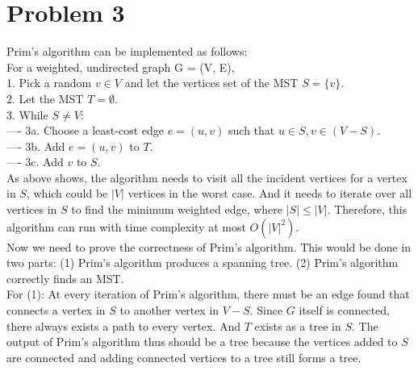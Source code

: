 \documentclass[titlepage, paper=a4, fontsize=11pt]{scrartcl} %
\numberwithin{equation}{section} %
\numberwithin{figure}{section} %
\numberwithin{table}{section} %
\begin{document}
\section*{Problem 3}
Prim's algorithm can be implemented as follows: \\
For a weighted, undirected graph G = (V, E), \\
1. Pick a random $v \in V$ and let the vertices set of the MST $S=\{v\}$. \\
2. Let the MST $T=\emptyset$. \\
3. While $S \neq V$: \\
---- 3a. Choose a least-cost edge $e=(u,v)$ such that $u \in S, v \in (V-S)$. \\
---- 3b. Add $e=(u,v)$ to $T$. \\
---- 3c. Add $v$ to $S$. \\

As above shows, the algorithm needs to visit all the incident vertices for a vertex in $S$, which could be $|V|$ vertices in the worst case. And it needs to iterate over all vertices in $S$ to find the minimum weighted edge, where $|S| \leq |V|$. Therefore, this algorithm can run with time complexity at most $O(|V|^2)$. \\

Now we need to prove the correctness of Prim's algorithm. This would be done in two parts: (1) Prim's algorithm produces a spanning tree. (2) Prim's algorithm correctly finds an MST. \\

For (1): At every iteration of Prim's algorithm, there must be an edge found that connects a vertex in $S$ to another vertex in $V-S$. Since $G$ itself is connected, there always exists a path to every vertex. And $T$ exists as a tree in $S$. The output of Prim's algorithm thus should be a tree because the vertices added to $S$ are connected and adding connected vertices to a tree still forms a tree. \\
\end{document}
